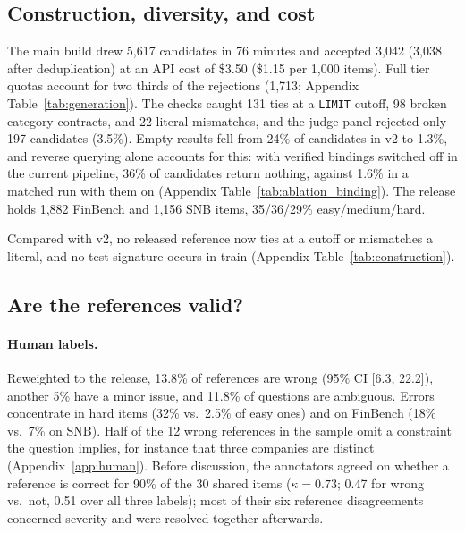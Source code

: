 \documentclass[11pt]{article}
\newcommand{\cy}[1]{\texttt{\small #1}}
\begin{document}
\subsection{Construction, diversity, and cost}
\label{sec:construction}
The main build drew 5,617 candidates in 76 minutes and accepted 3,042 (3,038 after deduplication) at an API cost of \$3.50 (\$1.15 per 1,000 items). Full tier quotas account for two thirds of the rejections (1,713; Appendix Table~\ref{tab:generation}). The checks caught 131 ties at a \cy{LIMIT} cutoff, 98 broken category contracts, and 22 literal mismatches, and the judge panel rejected only 197 candidates (3.5\%). Empty results fell from 24\% of candidates in v2 to 1.3\%, and reverse querying alone accounts for this: with verified bindings switched off in the current pipeline, 36\% of candidates return nothing, against 1.6\% in a matched run with them on (Appendix Table~\ref{tab:ablation_binding}). The release holds 1,882 FinBench and 1,156 SNB items, 35/36/29\% easy/medium/hard.

Compared with v2, no released reference now ties at a cutoff or mismatches a literal, and no test signature occurs in train (Appendix Table~\ref{tab:construction}).

\subsection{Are the references valid?}
\label{sec:validity}
\paragraph{Human labels.} Reweighted to the release, 13.8\% of references are wrong (95\% CI [6.3, 22.2]), another 5\% have a minor issue, and 11.8\% of questions are ambiguous. Errors concentrate in hard items (32\% vs.\ 2.5\% of easy ones) and on FinBench (18\% vs.\ 7\% on SNB). Half of the 12 wrong references in the sample omit a constraint the question implies, for instance that three companies are distinct (Appendix~\ref{app:human}). Before discussion, the annotators agreed on whether a reference is correct for 90\% of the 30 shared items ($\kappa=0.73$; 0.47 for wrong vs.\ not, 0.51 over all three labels); most of their six reference disagreements concerned severity and were resolved together afterwards.
\end{document}
